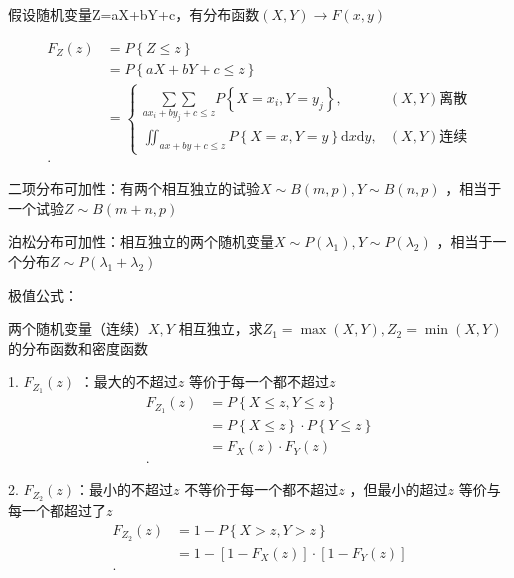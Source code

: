 假设随机变量Z=aX+bY+c，有分布函数$\left( X,Y \right) \to F\left( x,y \right) $

\begin{align*} 
    F_Z\left( z \right) &=P\left\{ Z\le z \right\} \\
                        &= P\left\{ aX+bY+c\le z \right\}  \\
                        &= \begin{cases}
                            \displaystyle{\underset{ax_{i}+by_{j}+c\le z}{\sum{\sum}}} P\left\{ X=x_{i},Y=y_{j} \right\} ,&\left( X,Y \right) \text{离散}\\
                            \displaystyle{\iint_{ax+by+c\le z}}P\left\{ X=x,Y=y \right\} \mathrm{d}x\mathrm{d}y,&\left( X,Y \right) \text{连续}
                        \end{cases} \\
.\end{align*}
\begin{notation}
    二项分布可加性：有两个相互独立的试验$X\sim B\left( m,p \right) ,Y\sim B\left( n,p \right) $ ，相当于一个试验$Z\sim B\left( m+n,p \right) $ 

    泊松分布可加性：相互独立的两个随机变量$X\sim P\left( \lambda_1 \right) ,Y\sim P\left( \lambda_2 \right) $ ，相当于一个分布$Z\sim P\left( \lambda_1+\lambda_2 \right) $
\end{notation}
\begin{notation}
    极值公式：

    两个随机变量（连续）$X,Y$ 相互独立，求$Z_1=\max\left( X,Y \right) ,Z_2=\min\left( X,Y \right) $的分布函数和密度函数

    1. $F_{Z_1}\left( z \right) $ ：最大的不超过$z$ 等价于每一个都不超过$z$ 
    \begin{align*}
        F_{Z_1}\left( z \right) &= P\left\{ X\le z,Y\le z \right\} \\
                                &= P\left\{ X\le z \right\} \cdot P\left\{ Y\le z \right\}  \\
                                &=F_X\left( z \right) \cdot F_Y\left( z \right) \\
    .\end{align*}

    2. $F_{Z_2}\left( z \right) $：最小的不超过$z$ 不等价于每一个都不超过$z$ ，但最小的超过$z$ 等价与每一个都超过了$z$ 
    \begin{align*}
        F_{Z_2}\left( z \right) &= 1-P\left\{ X>z,Y>z \right\}  \\
                                &= 1-[1-F_X\left( z \right) ]\cdot [1-F_Y\left( z \right) ] \\
    .\end{align*}
\end{notation}
